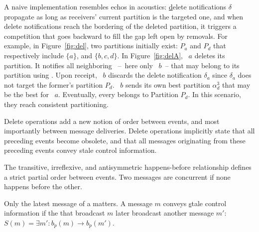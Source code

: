 

A naive implementation resembles echos in acoustics:
\underline{d}elete notifications $\delta$ propagate as long as
receivers' current partition is the targeted one, and when delete
notifications reach the bordering \processes of the deleted partition,
it triggers a competition that goes backward to fill the gap left open
by removals.  For example, in Figure~\ref{fig:del}, two partitions
initially exist: $P_a$ and $P_d$ that respectively include $\{a\}$,
and $\{b, c, d\}$. In Figure~\ref{fig:delA}, \Process~$a$ deletes its
partition. It notifies all neighboring \processes~--~here only
\Process~$b$~-- that may belong to its partition using \NAMEB. Upon
receipt, \Process~$b$ discards the delete notification $\delta_a$
since $\delta_a$ does not target the former's partition
$P_d$. \Process~$b$ sends its own best partition $\alpha_d^3$ that may
be the best for \Process~$a$. Eventually, every \process belongs to
Partition $P_d$. In this scenario, they reach consistent partitioning.

Delete operations add a new notion of order between events, and most
importantly between message deliveries. Delete operations implicitly
state that all preceding events become obsolete, and that all messages
originating from these preceding events convey stale control
information.




\begin{definition}
  The transitive, irreflexive, and antisymmetric happens-before
  relationship defines a strict partial order between events. Two
  messages are concurrent if none happens before the other.
\end{definition}

\begin{definition}
  Only the latest message of a \process matters. A message $m$ conveys
  \underline{s}tale control information if the \process that broadcast
  $m$ later broadcast another message $m'$: $S(m) = \exists m': b_p(m)
  \rightarrow b_p(m')$.

\end{definition}

